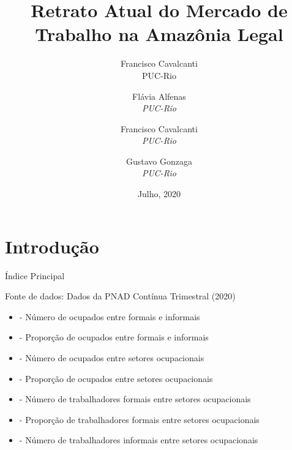 \documentclass[11pt]{beamer}
\author[Francisco Cavalcanti]{Francisco Cavalcanti\\\footnotesize{PUC-Rio}
}
\author{
Flávia  Alfenas\\
\textit{PUC-Rio}\\ \vspace{3mm}
\and  
Francisco Cavalcanti\\
\textit{PUC-Rio}\\ \vspace{3mm}
\and   
Gustavo Gonzaga \\
\textit{PUC-Rio} 
}
\date{Julho, 2020}
\title{Retrato Atual do Mercado de Trabalho na Amazônia Legal}
\begin{document}

\begin{frame}
\titlepage
\end{frame}


\section{Introdução}

\begin{frame}[label=indice_principal]{Índice Principal}
\begin{tiny}
Fonte de dados: Dados da PNAD Contínua Trimestral (2020)
\begin{itemize}  
	
\item{
	\hyperlink{_retrato_emprego_bar_formalidade}{} - {\tiny Número de ocupados entre formais e informais}
	}  

\item{
	\hyperlink{_retrato_emprego_pie_formalidade}{} - {\tiny Proporção de ocupados entre formais e informais}
	}  

\item{
	\hyperlink{_retrato_emprego_bar_n_de_ocupado_gstr}{} - {\tiny Número de ocupados entre setores ocupacionais}
	}  
		
		
\item{
	\hyperlink{_retrato_emprego_pie_n_de_ocupado_gstr}{} - {\tiny Proporção de ocupados entre setores ocupacionais}
	}  
		
\item{
	\hyperlink{_retrato_emprego_bar_n_de_formal_gstr}{} - {\tiny Número de trabalhadores formais entre setores ocupacionais}
	}  
		
		
\item{
	\hyperlink{_retrato_emprego_pie_n_de_formal_gstr}{} - {\tiny Proporção de trabalhadores formais entre setores ocupacionais}
	}  
			

\item{
	\hyperlink{_retrato_emprego_bar_n_de_informal_gstr}{} - {\tiny Número de trabalhadores informais entre setores ocupacionais}
	}  
		

\end{itemize}
\end{tiny}
\end{frame}
\end{document}
